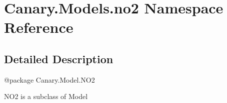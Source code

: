 \hypertarget{namespace_canary_1_1_models_1_1no2}{\section{Canary.\-Models.\-no2 Namespace Reference}
\label{namespace_canary_1_1_models_1_1no2}
}


\subsection{Detailed Description}
\begin{DoxyVerb}@package Canary.Model.NO2

NO2 is a subclass of Model
\end{DoxyVerb}
 